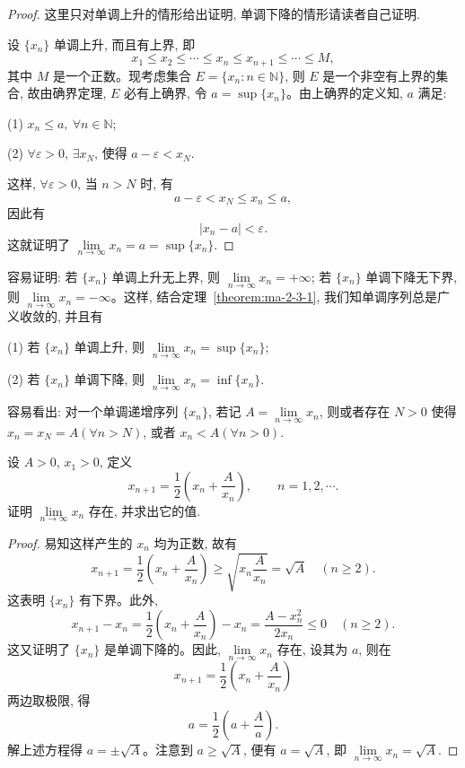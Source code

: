 \begin{proof}
这里只对单调上升的情形给出证明, 单调下降的情形请读者自己证明.

设 $\{x_n\}$ 单调上升, 而且有上界, 即
\[
  x_1\leqslant x_2\leqslant\cdots\leqslant x_n\leqslant x_{n+1}\leqslant\cdots\leqslant M,
\]
其中 $M$ 是一个正数。现考虑集合 $E=\{x_n:n\in\mathbb{N}\}$, 则 $E$ 是一个非空有上界的集合, 故由确界定理, $E$ 必有上确界, 令 $a=\sup\{x_n\}$。由上确界的定义知, $a$ 满足:

(1) $x_n\leqslant a,\ \forall n\in\mathbb{N}$;

(2) $\forall\varepsilon>0$, $\exists x_N$, 使得 $a-\varepsilon<x_N$.

这样, $\forall\varepsilon>0$, 当 $n>N$ 时, 有
\[
  a-\varepsilon<x_N\leqslant x_n\leqslant a,
\]
因此有
\[
  |x_n-a|<\varepsilon.
\]
这就证明了 $\lim\limits_{n\to\infty}x_n=a=\sup\{x_n\}$.
\end{proof}


\begin{remark}\label{remark:ma-2-source-56}
容易证明: 若 $\{x_n\}$ 单调上升无上界, 则 $\lim\limits_{n\to\infty}x_n=+\infty$; 若 $\{x_n\}$ 单调下降无下界, 则 $\lim\limits_{n\to\infty}x_n=-\infty$。这样, 结合定理~\ref{theorem:ma-2-3-1}, 我们知单调序列总是广义收敛的, 并且有

(1) 若 $\{x_n\}$ 单调上升, 则 $\lim\limits_{n\to\infty}x_n=\sup\{x_n\}$;

(2) 若 $\{x_n\}$ 单调下降, 则 $\lim\limits_{n\to\infty}x_n=\inf\{x_n\}$.
\end{remark}

容易看出: 对一个单调递增序列 $\{x_n\}$, 若记 $A=\lim\limits_{n\to\infty}x_n$, 则或者存在 $N>0$ 使得 $x_n=x_N=A(\forall n>N)$, 或者 $x_n<A(\forall n>0)$.

\begin{example}\label{example:ma-2-3-1}
设 $A>0$, $x_1>0$, 定义
\[
  x_{n+1}=\frac12\left(x_n+\frac A{x_n}\right),\qquad n=1,2,\cdots.
\]
证明 $\lim\limits_{n\to\infty}x_n$ 存在, 并求出它的值.
\end{example}


\begin{proof}
易知这样产生的 $x_n$ 均为正数, 故有
\[
  x_{n+1}=\frac12\left(x_n+\frac A{x_n}\right)
  \geqslant \sqrt{x_n\frac A{x_n}}=\sqrt A
  \quad(n\geqslant2).
\]
这表明 $\{x_n\}$ 有下界。此外,
\[
  x_{n+1}-x_n
  =
  \frac12\left(x_n+\frac A{x_n}\right)-x_n
  =
  \frac{A-x_n^2}{2x_n}\leqslant0
  \quad(n\geqslant2).
\]
这又证明了 $\{x_n\}$ 是单调下降的。因此, $\lim\limits_{n\to\infty}x_n$ 存在, 设其为 $a$, 则在
\[
  x_{n+1}=\frac12\left(x_n+\frac A{x_n}\right)
\]
两边取极限, 得
\[
  a=\frac12\left(a+\frac Aa\right).
\]
解上述方程得 $a=\pm\sqrt A$。注意到 $a\geqslant\sqrt A$, 便有 $a=\sqrt A$, 即 $\lim\limits_{n\to\infty}x_n=\sqrt A$.
\end{proof}


